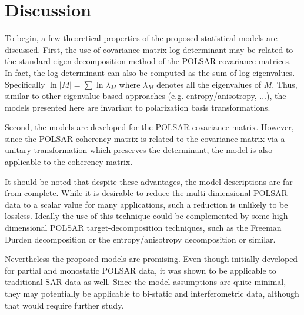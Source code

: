 \documentclass[journal]{IEEEtran}
\begin{document}
\section{Discussion}
\label{sec:discussion}

To begin, a few theoretical properties of the proposed statistical models are discussed.
First, the use of covariance matrix log-determinant may be related to the standard eigen-decomposition method of the POLSAR covariance matrices.
In fact, the log-determinant can also be computed as the sum of log-eigenvalues.
Specifically $\ln{|M|} = \sum \ln{\lambda_M}$ where $\lambda_M$ denotes all the eigenvalues of $M$.
Thus, similar to other eigenvalue based approaches (e.g. entropy/anisotropy, ...),
  the models presented here are invariant to polarization basis transformations.

Second, the models are developed for the POLSAR covariance matrix.
However, since the POLSAR coherency matrix is related to the covariance matrix via a unitary transformation which preserves the determinant,
  the model is also applicable to the coherency matrix.

It should be noted that despite these advantages, the model descriptions are far from complete.
While it is desirable to reduce the multi-dimensional POLSAR data to a scalar value for many applications,
  such a reduction is unlikely to be lossless.  
Ideally %
the use of this technique could be complemented by some high-dimensional POLSAR target-decomposition techniques, such as the Freeman Durden decomposition \cite{Freeman_1998_TGRS_963} or the entropy/anisotropy decomposition \cite{Cloude_1997_TGRS_68} or similar.

Nevertheless the proposed models are promising.
Even though initially developed for partial and monostatic POLSAR data,
  it was shown to be applicable to traditional SAR data as well.
Since the model assumptions are quite minimal, they may potentially be applicable to bi-static and interferometric data, although that would require further study.
\end{document}
